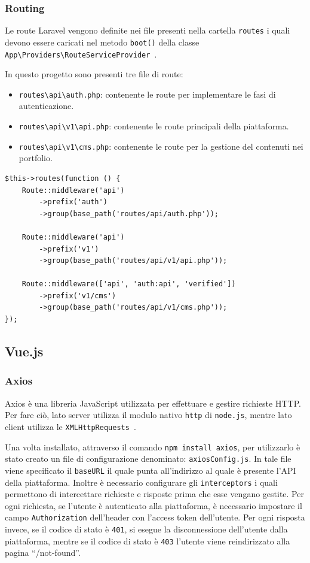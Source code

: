\subsubsection{Routing}
Le route Laravel vengono definite nei file presenti nella cartella \verb|routes| i quali devono essere caricati nel metodo \verb|boot()| della classe \sloppy\verb|App\Providers\RouteServiceProvider|~\cite{LaravelRoute}.

In questo progetto sono presenti tre file di route:
\begin{itemize}
	\item \verb|routes\api\auth.php|: contenente le route per implementare le fasi di autenticazione.
	\item \verb|routes\api\v1\api.php|: contenente le route principali della piattaforma.
	\item \verb|routes\api\v1\cms.php|: contenente le route per la gestione del contenuti nei portfolio.
\end{itemize}

\begin{lstlisting}
$this->routes(function () {
	Route::middleware('api')
		->prefix('auth')
		->group(base_path('routes/api/auth.php'));
	
	Route::middleware('api')
		->prefix('v1')
		->group(base_path('routes/api/v1/api.php'));
	
	Route::middleware(['api', 'auth:api', 'verified'])
		->prefix('v1/cms')
		->group(base_path('routes/api/v1/cms.php'));
});
\end{lstlisting}

\subsection{Vue.js}
\subsubsection{Axios}
Axios \`e una libreria JavaScript utilizzata per effettuare e gestire richieste HTTP. Per fare ci\`o, lato server utilizza il modulo nativo \verb|http| di \verb|node.js|, mentre lato client utilizza le \verb|XMLHttpRequests|~\cite{Axios}.

Una volta installato, attraverso il comando \verb|npm install axios|, per utilizzarlo \`e stato creato un file di configurazione denominato: \verb|axiosConfig.js|. In tale file viene specificato il \verb|baseURL| il quale punta all'indirizzo al quale \`e presente l'API della piattaforma. Inoltre \`e necessario configurare gli \verb|interceptors| i quali permettono di intercettare richieste e risposte prima che esse vengano gestite. Per ogni richiesta, se l'utente \`e autenticato alla piattaforma, \`e necessario impostare il campo \verb|Authorization| dell'header con l'access token dell'utente. Per ogni risposta invece, se il codice di stato \`e \verb|401|, si esegue la disconnessione dell'utente dalla piattaforma, mentre se il codice di stato \`e \verb|403| l'utente viene reindirizzato alla pagina ``/not-found''.
